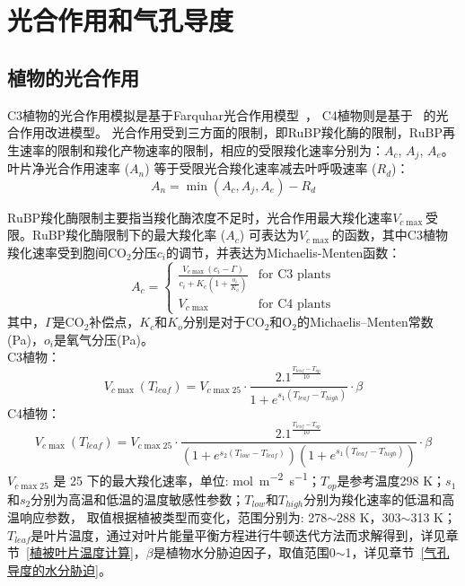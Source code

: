 \chapter{光合作用和气孔导度}


\section{植物的光合作用}\label{植物的光合作用}
C3植物的光合作用模拟是基于Farquhar光合作用模型~\citep{farquhar1980biochemical}，
C4植物则是基于~\citet{collatz1992} 的光合作用改进模型。
光合作用受到三方面的限制，即RuBP羧化酶的限制，RuBP再生速率的限制和羧化产物速率的限制，相应的受限羧化速率分别为：$A_{c}$, $A_{j}$, $A_{e}$。叶片净光合作用速率 ($A_{n}$) 等于受限光合羧化速率减去叶呼吸速率 ($R_d$)：
\begin{equation}\label{An1}
A_{n}=\min \left(A_{c}, A_{j}, A_{e}\right)-R_{d}
\end{equation}


RuBP羧化酶限制主要指当羧化酶浓度不足时，光合作用最大羧化速率$V_{c \max }$受限。RuBP羧化酶限制下的最大羧化率 ($A_c$) 可表达为$V_{c \max }$的函数，其中C3植物羧化速率受到胞间CO$_2$分压$c_i$的调节，并表达为Michaelis-Menten函数：
\begin{equation}\label{A_C1}
A_{c}=\begin{cases}
\frac{V_{c \max }\left(c_{i}-\Gamma\right)}{c_{i}+K_{c}\left(1+\frac{o_{i}}{K_{o}}\right)}
     & \text{for C3 plants} \\ 
V_{c \max } & \text{for C4 plants}
\end{cases}
\end{equation}
其中，$\Gamma$是CO$_2$补偿点，$K_c$和$K_o$分别是对于CO$_2$和O$_2$的Michaelis--Menten常数(Pa)，$o_i$是氧气分压(Pa)。\\
C3植物：\\
\begin{equation}\label{V_cmax_a}
V_{c \max }\left(T_{{leaf }}\right)=V_{c \max 25} \cdot \frac{2.1^{\frac{T_{{leaf }}-T_{o p}}{10}}}{1+e^{s_{1}\left(T_{{leaf }}-T_{{high }}\right)}} \cdot \beta
\end{equation}
C4植物：\\
\begin{equation}\label{V_cmax_b}
V_{c \max }\left(T_{{leaf }}\right)=V_{c \max 25} \cdot \frac{2.1^{\frac{T_{{leaf }}-T_{o p}}{10}}}{\left(1+e^{s_{2}\left(T_{{low }}
 - T_{{leaf }}\right)}\right)\left(1+e^{s_{1}\left(T_{{leaf }}-T_{h i g h}\right)}\right)} \cdot \beta
\end{equation}
$V_{c \max 25}$ 是 25 \textcelsius 下的最大羧化速率，单位: \unit{mol.m^{-2}.s^{-1}}；$T_{op}$是参考温度298 K；$s_1$和$s_2$分别为高温和低温的温度敏感性参数；$T_{low}$和$T_{high}$分别为羧化速率的低温和高温响应参数，
取值根据植被类型而变化，范围分别为: 278$\sim$288 K，303$\sim$313 K；$T_{leaf}$是叶片温度，通过对叶片能量平衡方程进行牛顿迭代方法而求解得到，详见章节~\ref{植被叶片温度计算}，$\beta$是植物水分胁迫因子，取值范围0$\sim$1，详见章节~\ref{气孔导度的水分胁迫}。

